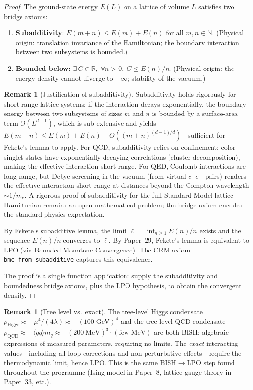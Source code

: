\documentclass[11pt,a4paper]{article}
\theoremstyle{plain}
\theoremstyle{definition}
\newtheorem{remark}[theorem]{Remark}
\newcommand{\NN}{\mathbb{N}}
\newcommand{\RR}{\mathbb{R}}
\newcommand{\LPO}{\ensuremath{\mathrm{LPO}}}
\newcommand{\BISH}{\ensuremath{\mathrm{BISH}}}
\begin{document}
\begin{proof}
The ground-state energy $E(L)$ on a lattice of volume $L$ satisfies
two bridge axioms:
\begin{enumerate}[nosep]
\item \textbf{Subadditivity:} $E(m+n) \leq E(m) + E(n)$ for all
  $m, n \in \NN$.  (Physical origin: translation invariance of the
  Hamiltonian; the boundary interaction between two subsystems is bounded.)
\item \textbf{Bounded below:} $\exists\, C \in \RR,\; \forall n > 0,\;
  C \leq E(n)/n$.  (Physical origin: the energy density cannot diverge
  to $-\infty$; stability of the vacuum.)
\end{enumerate}

\begin{remark}[Justification of subadditivity]\label{rem:subadditivity}
Subadditivity holds rigorously for short-range lattice systems:
if the interaction decays exponentially, the boundary energy between
two subsystems of sizes $m$ and $n$ is bounded by a surface-area
term $O(L^{d-1})$, which is sub-extensive and yields
$E(m+n) \leq E(m) + E(n) + O((m+n)^{(d-1)/d})$---sufficient
for Fekete's lemma to apply.
For QCD, subadditivity relies on confinement: color-singlet states
have exponentially decaying correlations (cluster decomposition),
making the effective interaction short-range.
For QED, Coulomb interactions are long-range, but Debye screening
in the vacuum (from virtual $e^+e^-$ pairs) renders the effective
interaction short-range at distances beyond the Compton wavelength
$\sim 1/m_e$.  A rigorous proof of subadditivity for the full
Standard Model lattice Hamiltonian remains an open mathematical
problem; the bridge axiom encodes the standard physics expectation.
\end{remark}
By Fekete's subadditive lemma, the limit
$\ell = \inf_{n \geq 1} E(n)/n$ exists and the sequence $E(n)/n$
converges to $\ell$.  By Paper~29, Fekete's lemma is equivalent to
$\LPO$ (via Bounded Monotone Convergence).  The CRM axiom
\texttt{bmc\_from\_subadditive} captures this equivalence.

The proof is a single function application: supply the subadditivity
and boundedness bridge axioms, plus the $\LPO$ hypothesis, to obtain
the convergent density.
\end{proof}

\begin{remark}[Tree level vs.\ exact]
The tree-level Higgs condensate $\rho_{\mathrm{Higgs}} \approx -\mu^4/(4\lambda)
\approx -(100\;\mathrm{GeV})^4$ and the tree-level QCD condensate
$\rho_{\mathrm{QCD}} \approx -\langle\bar{q}q\rangle m_q \approx
-(200\;\mathrm{MeV})^3 \cdot (\text{few MeV})$ are both $\BISH$:
algebraic expressions of measured parameters, requiring no limits.
The \emph{exact} interacting values---including all loop corrections
and non-perturbative effects---require the thermodynamic limit,
hence $\LPO$.  This is the same $\BISH \to \LPO$ step found
throughout the programme (Ising model in Paper~8, lattice gauge theory
in Paper~33, etc.).
\end{remark}
\end{document}
